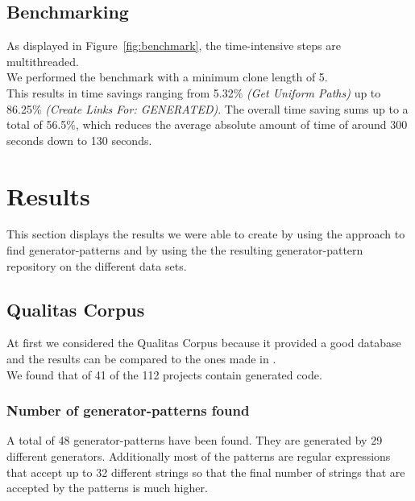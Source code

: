 \subsection{Benchmarking}
\label{section:benchmark}
As displayed in Figure~\ref{fig:benchmark}, the time-intensive steps are multithreaded.\\
We performed the benchmark with a minimum clone length of 5.\\
This results in time savings ranging from 5.32\% \textit{(Get Uniform Paths)} up to 86.25\% \textit{(Create Links For: GENERATED)}. The overall time saving sums up to a total of 56.5\%, which reduces the average absolute amount of time of around 300 seconds down to 130 seconds. 



\section{Results}
This section displays the results we were able to create by using the approach to find generator-patterns and by using the the resulting generator-pattern repository on the different data sets. 
\subsection{Qualitas Corpus}
At first we considered the Qualitas Corpus because it provided a good database and the results can be compared to the ones made in \cite{Bernwieser2014}.\\
We found that of 41 of the 112 projects contain generated code. 

\subsubsection{Number of generator-patterns found}
A total of 48 generator-patterns have been found. They are generated by 29 different generators. Additionally most of the patterns are regular expressions that accept up to 32 different strings so that the final number of strings that are accepted by the patterns is much higher.

%
